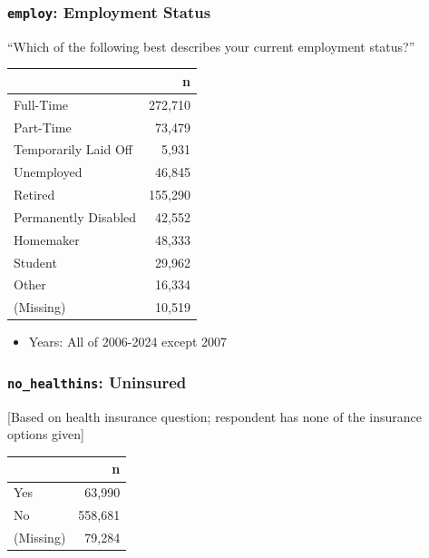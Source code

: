 \documentclass[10pt,article,oneside]{memoir}
\begin{document}
\subsubsection{\texorpdfstring{\texttt{employ}: Employment
Status}{employ: Employment Status}}\label{employ-employment-status}

``Which of the following best describes your current employment
status?''

\begin{table}[H]
\centering
\begin{tabular}[t]{lr}
\toprule
 & n\\
\midrule
Full-Time & 272,710\\
Part-Time & 73,479\\
Temporarily Laid Off & 5,931\\
Unemployed & 46,845\\
Retired & 155,290\\
Permanently Disabled & 42,552\\
Homemaker & 48,333\\
Student & 29,962\\
Other & 16,334\\
(Missing) & 10,519\\
\bottomrule
\end{tabular}
\end{table}

\begin{itemize}
\tightlist
\item
  Years: All of 2006-2024 except 2007
\end{itemize}

\subsubsection{\texorpdfstring{\texttt{no\_healthins}:
Uninsured}{no\_healthins: Uninsured}}\label{no_healthins-uninsured}

{[}Based on health insurance question; respondent has none of the
insurance options given{]}

\begin{table}[H]
\centering
\begin{tabular}[t]{lr}
\toprule
 & n\\
\midrule
Yes & 63,990\\
No & 558,681\\
(Missing) & 79,284\\
\bottomrule
\end{tabular}
\end{table}
\end{document}
